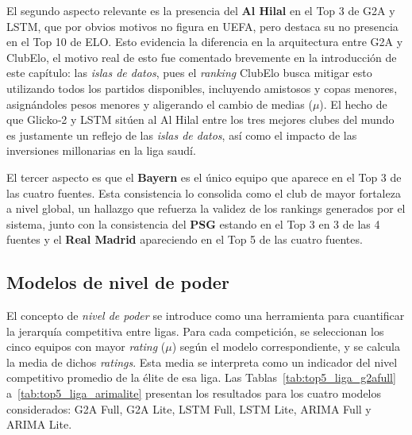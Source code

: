 El segundo aspecto relevante es la presencia del \textbf{Al Hilal} en el Top 3 de G2A y LSTM, que por obvios motivos no figura en UEFA, pero destaca su no presencia en el Top 10 de ELO. Esto evidencia la diferencia en la arquitectura entre G2A y ClubElo, el motivo real de esto fue comentado brevemente en la introducci\'on de este cap\'itulo: las \textit{islas de datos}, pues el \textit{ranking} ClubElo busca mitigar esto utilizando todos los partidos disponibles, incluyendo amistosos y copas menores, asign\'andoles pesos menores y aligerando el cambio de medias (\(\mu\)). El hecho de que Glicko‑2 y LSTM sit\'uen al Al Hilal entre los tres mejores clubes del mundo es justamente un reflejo de las \textit{islas de datos}, as\'i como el impacto de las inversiones millonarias en la liga saud\'i.

El tercer aspecto es que el \textbf{Bayern} es el \'unico equipo que aparece en el Top 3 de las cuatro fuentes. Esta consistencia lo consolida como el club de mayor fortaleza a nivel global, un hallazgo que refuerza la validez de los rankings generados por el sistema, junto con la consistencia del \textbf{PSG} estando en el Top 3 en 3 de las 4 fuentes y el \textbf{Real Madrid} apareciendo en el Top 5 de las cuatro fuentes.

\subsection{Modelos de nivel de poder}

El concepto de \emph{nivel de poder} se introduce como una herramienta para cuantificar la jerarqu\'ia competitiva entre ligas. Para cada competici\'on, se seleccionan los cinco equipos con mayor \textit{rating} (\(\mu\)) seg\'un el modelo correspondiente, y se calcula la media de dichos \textit{ratings}. Esta media se interpreta como un indicador del nivel competitivo promedio de la \'elite de esa liga. Las Tablas~\ref{tab:top5_liga_g2afull} a~\ref{tab:top5_liga_arimalite} presentan los resultados para los cuatro modelos considerados: G2A Full, G2A Lite, LSTM Full, LSTM Lite, ARIMA Full y ARIMA Lite.


